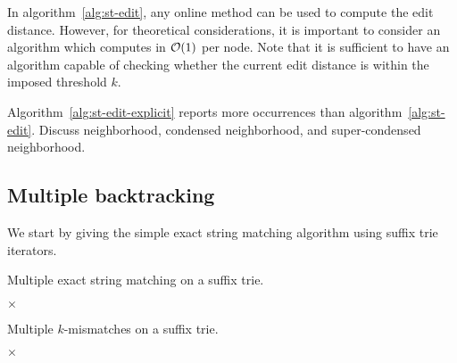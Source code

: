 In algorithm~\ref{alg:st-edit}, any online method can be used to compute the edit distance.
However, for theoretical considerations, it is important to consider an algorithm which computes in $\mathcal{O}(1)$ per node.
Note that it is sufficient to have an algorithm capable of checking whether the current edit distance is within the imposed threshold $k$.

Algorithm~\ref{alg:st-edit-explicit} reports more occurrences than algorithm~\ref{alg:st-edit}.
Discuss neighborhood, condensed neighborhood, and super-condensed neighborhood.


\subsection{Multiple backtracking}

We start by giving the simple exact string matching algorithm using suffix trie iterators.

\begin{algorithm}[h]
\caption{Multiple exact string matching on a suffix trie.}
\label{alg:st-exact-multi}
\begin{algorithmic}[1]
		\State \Report {} $\times$ 
	\Else
		\State {}
		\Repeat
				\State {}
				\State {}
			\EndIf
	\EndIf
\EndProcedure
\end{algorithmic}
\end{algorithm}

\begin{algorithm}[h]
\caption{Multiple $k$-mismatches on a suffix trie.}
\label{alg:st-hamming-multi}
\begin{algorithmic}[1]
			\State \Report {} $\times$ 
			\Repeat
				\Repeat
					\State {}
		\EndIf
	\EndIf
\EndProcedure
\end{algorithmic}
\end{algorithm}

